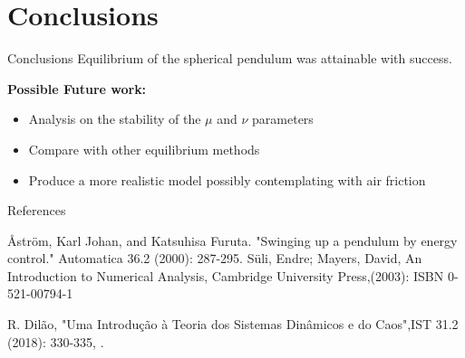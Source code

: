 \documentclass{beamer}
\begin{document}
\section{Conclusions}
\begin{frame}{Conclusions}
  Equilibrium of the spherical pendulum was attainable with success.
  
  \textbf{Possible Future work:}
  
  \begin{itemize}
  \item Analysis on the stability of the $\mu$ and $\nu$ parameters
  \item Compare with other equilibrium methods
  \item Produce a more realistic model possibly contemplating with air friction
  \end{itemize}
\end{frame}
\begin{frame}{References}
  \begin{thebibliography}{99}

 Åström, Karl Johan, and Katsuhisa Furuta. "Swinging up a pendulum by energy control." Automatica 36.2 (2000): 287-295.
Süli, Endre; Mayers, David, An Introduction to Numerical Analysis, Cambridge University Press,(2003): ISBN 0-521-00794-1 

 R. Dilão, "Uma Introdução à Teoria dos Sistemas Dinâmicos e do Caos",IST 31.2 (2018): 330-335, .

\end{thebibliography}
  \end{frame}
\end{document}
